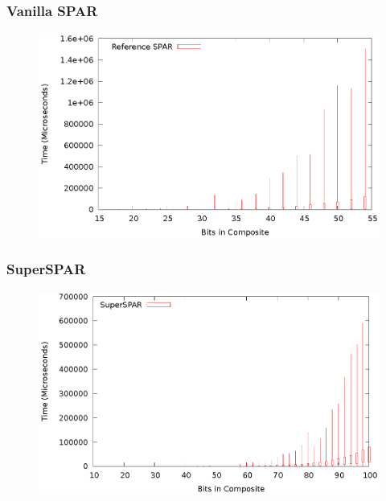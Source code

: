 \documentclass{beamer}
\begin{document}
\begin{frame}
\frametitle{Vanilla SPAR}
\begin{figure}
\includegraphics[scale=0.86]{factor-spar-whisker}
\end{figure}
\end{frame}
\begin{frame}
\frametitle{SuperSPAR}
\begin{figure}
\includegraphics[scale=0.86]{factor-sspar-whisker}
\end{figure}
\end{frame}
\end{document}
